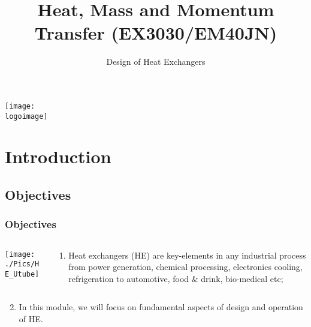 \documentclass[10pt,compress,handout,ignorenonframetext,unknownkeysallowed]{beamer}
\institute{School of Engineering}
\title{Heat, Mass and Momentum Transfer (EX3030/EM40JN)}
\subtitle{Design of Heat Exchangers}
\date[ ]{ }
\newcommand{\logoimage}{../FigBanner/UoAHorizBanner}
\begin{document}
\begin{frame}
  \titlepage 
  \vfill%
  \begin{center}
    \texttt{[image: \\logoimage]}
  \end{center}
\end{frame}




\section{Introduction} 


\subsection{Objectives}

\begin{frame}
 \frametitle{Objectives}
    \begin{columns}
       \begin{column}[l]{0.6\linewidth}
         \hspace{-.70cm}\texttt{[image: ./Pics/HE\_Utube]}
       \end{column}
       \begin{column}[l]{0.4\linewidth}
          \begin{enumerate}
              \item<1-> Heat exchangers (HE) are key-elements in any industrial process from power generation, chemical processing, electronics cooling, refrigeration to automotive, food $\&$ drink, bio-medical etc;
          \end{enumerate}
       \end{column}      
    \end{columns}
          \begin{enumerate}\setcounter{enumi}{1}
              \item<2-> In this module, we will focus on fundamental aspects of design and operation of HE.
          \end{enumerate}
\end{frame}
\end{document}
